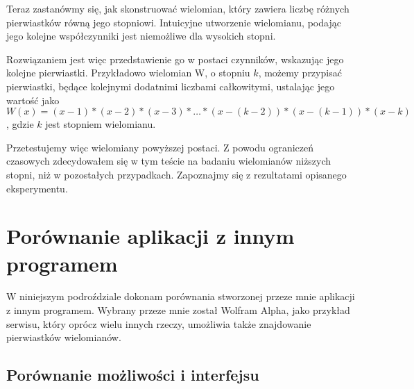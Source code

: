 \documentclass[oneside,a4paper]{book}
\begin{document}
	Teraz zastanówmy się, jak skonstruować wielomian, który zawiera liczbę różnych pierwiastków równą jego stopniowi. Intuicyjne utworzenie wielomianu, podając jego kolejne współczynniki jest niemożliwe dla wysokich stopni.
	
	Rozwiązaniem jest więc przedstawienie go w postaci czynników, wskazując jego kolejne pierwiastki. Przykładowo wielomian W, o stopniu $k$, możemy przypisać pierwiastki, będące kolejnymi dodatnimi liczbami całkowitymi, ustalając jego wartość jako $W(x)=(x-1)*(x-2)*(x-3)*…*(x-(k-2))*(x-(k-1))*(x-k)$, gdzie $k$ jest stopniem wielomianu.
	
	Przetestujemy więc wielomiany powyższej postaci. Z powodu ograniczeń czasowych zdecydowałem się w tym teście na badaniu wielomianów niższych stopni, niż w pozostałych przypadkach. Zapoznajmy się z rezultatami opisanego eksperymentu.
	
	
	\section {Porównanie aplikacji z innym programem}
	
	W niniejszym podroździale dokonam porównania stworzonej przeze mnie aplikacji z innym programem. Wybrany przeze mnie został Wolfram Alpha, jako przykład serwisu, który oprócz wielu innych rzeczy, umożliwia także znajdowanie pierwiastków wielomianów.
	
	\subsection {Porównanie możliwości i interfejsu}
	
\end{document}

